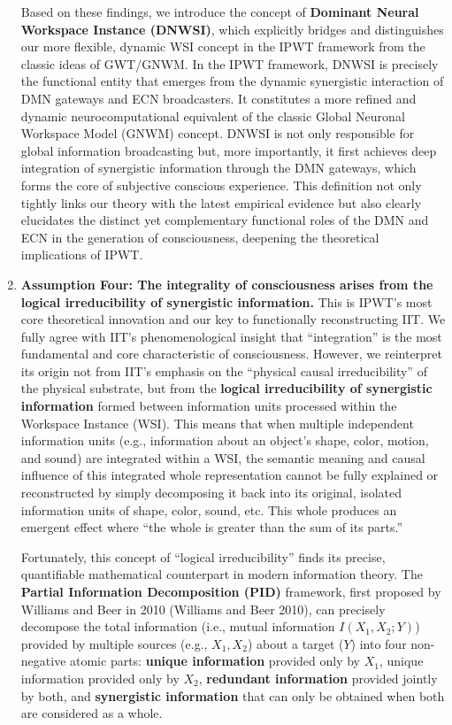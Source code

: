 \documentclass[
  a4paper]{article}
\begin{document}
\begin{enumerate}
  Based on these findings, we introduce the concept of \textbf{Dominant
  Neural Workspace Instance (DNWSI)}, which explicitly bridges and
  distinguishes our more flexible, dynamic WSI concept in the IPWT
  framework from the classic ideas of GWT/GNWM. In the IPWT framework,
  DNWSI is precisely the functional entity that emerges from the dynamic
  synergistic interaction of DMN gateways and ECN broadcasters. It
  constitutes a more refined and dynamic neurocomputational equivalent
  of the classic Global Neuronal Workspace Model (GNWM) concept. DNWSI
  is not only responsible for global information broadcasting but, more
  importantly, it first achieves deep integration of synergistic
  information through the DMN gateways, which forms the core of
  subjective conscious experience. This definition not only tightly
  links our theory with the latest empirical evidence but also clearly
  elucidates the distinct yet complementary functional roles of the DMN
  and ECN in the generation of consciousness, deepening the theoretical
  implications of IPWT.
\item
  \textbf{Assumption Four: The integrality of consciousness arises from
  the logical irreducibility of synergistic information.} This is IPWT's
  most core theoretical innovation and our key to functionally
  reconstructing IIT. We fully agree with IIT's phenomenological insight
  that ``integration'' is the most fundamental and core characteristic
  of consciousness. However, we reinterpret its origin not from IIT's
  emphasis on the ``physical causal irreducibility'' of the physical
  substrate, but from the \textbf{logical irreducibility of synergistic
  information} formed between information units processed within the
  Workspace Instance (WSI). This means that when multiple independent
  information units (e.g., information about an object's shape, color,
  motion, and sound) are integrated within a WSI, the semantic meaning
  and causal influence of this integrated whole representation cannot be
  fully explained or reconstructed by simply decomposing it back into
  its original, isolated information units of shape, color, sound, etc.
  This whole produces an emergent effect where ``the whole is greater
  than the sum of its parts.''

  Fortunately, this concept of ``logical irreducibility'' finds its
  precise, quantifiable mathematical counterpart in modern information
  theory. The \textbf{Partial Information Decomposition (PID)}
  framework, first proposed by Williams and Beer in 2010 (Williams and
  Beer 2010), can precisely decompose the total information (i.e.,
  mutual information \(I(X_1, X_2; Y)\)) provided by multiple sources
  (e.g., \(X_1, X_2\)) about a target (\(Y\)) into four non-negative
  atomic parts: \textbf{unique information} provided only by \(X_1\),
  unique information provided only by \(X_2\), \textbf{redundant
  information} provided jointly by both, and \textbf{synergistic
  information} that can only be obtained when both are considered as a
  whole.


\end{enumerate}
\end{document}
